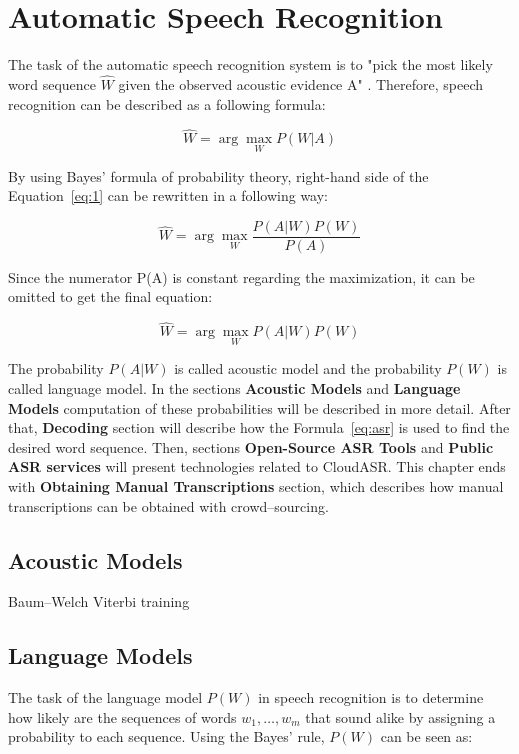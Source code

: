 \chapter{Automatic Speech Recognition}
The task of the automatic speech recognition system is to "pick the most likely word sequence $\widehat{W}$
  given the observed acoustic evidence A" \cite{frederick1997statistical}.
Therefore, speech recognition can be described as a following formula:

\begin{equation}
  \label{eq:1}
  \widehat{W} = \arg \max_{W} P(W|A)
\end{equation}

By using Bayes' formula of probability theory,
  right-hand side of the Equation~\ref{eq:1} can be rewritten in a following way:

\begin{equation}
 \widehat{W} = \arg \max_{W} \frac{P(A|W) P(W)}{P(A)}
\end{equation}

Since the numerator P(A) is constant regarding the maximization,
  it can be omitted to get the final equation:

\begin{equation}
  \label{eq:asr}
  \widehat{W} = \arg \max_{W} P(A|W) P(W)
\end{equation}

The probability $P(A|W)$ is called acoustic model and the probability $P(W)$ is called language model.
In the sections \textbf{Acoustic Models} and \textbf{Language Models} computation of these probabilities will be described in more detail.
After that, \textbf{Decoding} section will describe how the Formula~\ref{eq:asr} is used to find the desired word sequence.
Then, sections \textbf{Open-Source ASR Tools} and \textbf{Public ASR services} will present technologies related to CloudASR.
This chapter ends with \textbf{Obtaining Manual Transcriptions} section,
  which describes how manual transcriptions can be obtained with crowd--sourcing.


\section{Acoustic Models}
\BLIND
\BLIND

Baum--Welch \cite{welch2003hidden}
Viterbi training \cite{franzini1990connectionist}

\section{Language Models}
The task of the language model $P(W)$ in speech recognition is
  to determine how likely are the sequences of words $w_1,\dots,w_m$ that sound alike
  by assigning a probability to each sequence.
Using the Bayes' rule, $P(W)$ can be seen as:

